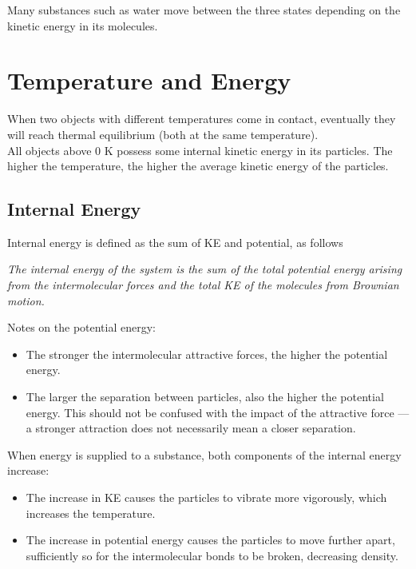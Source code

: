 \documentclass[a4paper,12pt]{article}
\let\oldsection\section
\renewcommand\section{\clearpage\oldsection}
\newcommand{\lb}{\\[8pt]}
\begin{document}
Many substances such as water move between the three states depending on the kinetic energy in its molecules.

\section{Temperature and Energy}

When two objects with different temperatures come in contact, eventually they will reach thermal equilibrium (both at the same temperature).\lb
All objects above 0 K possess some internal kinetic energy in its particles. The higher the temperature, the higher the average kinetic energy of the particles.

\subsection{Internal Energy}

Internal energy is defined as the sum of KE and potential, as follows
\begin{center}
  \textit{The internal energy of the system is the sum of the total potential energy arising from the intermolecular forces and the total KE of the molecules from Brownian motion.}
\end{center}
Notes on the potential energy:
\begin{itemize}
  \item The stronger the intermolecular attractive forces, the higher the potential energy.
  \item The larger the separation between particles, also the higher the potential energy. This should not be confused with the impact of the attractive force --- a stronger attraction does not necessarily mean a closer separation.
\end{itemize}


When energy is supplied to a substance, both components of the internal energy increase:
\begin{itemize}
  \item The increase in KE causes the particles to vibrate more vigorously, which increases the temperature.
  \item The increase in potential energy causes the particles to move further apart, sufficiently so for the intermolecular bonds to be broken, decreasing density.
\end{itemize}

\pagebreak
\end{document}
